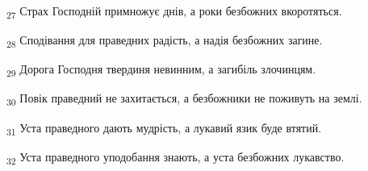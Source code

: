 \begin{tcolorbox}
\textsubscript{27} Страх Господній примножує днів, а роки безбожних вкоротяться.
\end{tcolorbox}
\begin{tcolorbox}
\textsubscript{28} Сподівання для праведних радість, а надія безбожних загине.
\end{tcolorbox}
\begin{tcolorbox}
\textsubscript{29} Дорога Господня твердиня невинним, а загибіль злочинцям.
\end{tcolorbox}
\begin{tcolorbox}
\textsubscript{30} Повік праведний не захитається, а безбожники не поживуть на землі.
\end{tcolorbox}
\begin{tcolorbox}
\textsubscript{31} Уста праведного дають мудрість, а лукавий язик буде втятий.
\end{tcolorbox}
\begin{tcolorbox}
\textsubscript{32} Уста праведного уподобання знають, а уста безбожних лукавство.
\end{tcolorbox}
